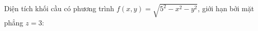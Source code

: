 \documentclass[preview]{standalone}
\begin{document}
\begin{center}
Diện tích khối cầu có phương trình $f(x, y)=\sqrt{5^2-x^2-y^2}$, giới hạn bởi mặt phẳng $z = 3$:
\end{center}
\end{document}
